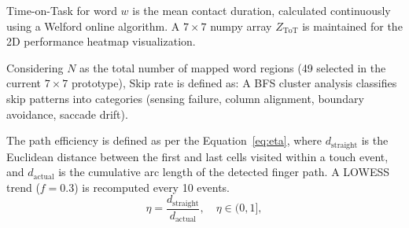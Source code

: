 \documentclass[conference]{IEEEtran}
\begin{document}

    Time-on-Task for word $w$ is the mean contact duration, calculated continuously using a Welford online algorithm.
    A $7\times7$ numpy array $Z_{\mathrm{ToT}}$ is maintained for the 2D performance heatmap visualization.


    Considering $N$ as the total number of mapped word regions (49 selected in the
    current $7\times7$ prototype), Skip rate is defined as:
    A BFS cluster analysis classifies skip patterns into categories
    (sensing failure, column alignment, boundary avoidance, saccade
    drift).

    The path efficiency is defined as per the Equation~\ref{eq:eta},
    where $d_{\mathrm{straight}}$ is the Euclidean distance between the
    first and last cells visited within a touch event, and
    $d_{\mathrm{actual}}$ is the cumulative arc length of the detected
    finger path. A LOWESS trend ($f=0.3$) is recomputed every 10 events.
    \begin{equation}
        \eta = \frac{d_{\mathrm{straight}}}{d_{\mathrm{actual}}},
        \quad \eta \in (0, 1],
        \label{eq:eta}
    \end{equation}

\end{document}

